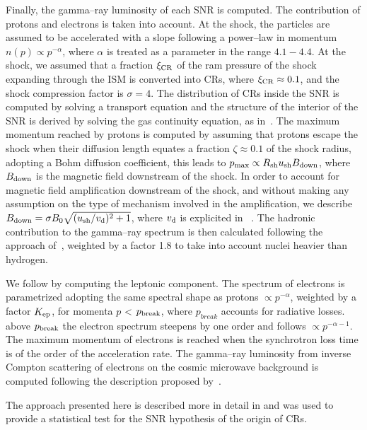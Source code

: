 \documentclass{article}
\begin{document}
Finally, the gamma--ray luminosity of each SNR is computed. The contribution of protons and electrons is taken into account. At the shock, the particles are assumed to be accelerated with a slope following a power--law in momentum $n(p) \propto p^{-\alpha}$, where $\alpha$ is treated as a parameter in the range $4.1 - 4.4$. At the shock, we assumed that a fraction $\xi_{\rm CR}$ of the ram pressure of the shock expanding through the ISM is converted into CRs, where $\xi_{\rm CR} \approx 0.1$, and the shock compression factor is $\sigma=4$.  
The distribution of CRs inside the SNR is computed by solving a transport equation and the structure of the interior of the SNR is derived by solving the gas continuity equation, as in~\cite{pz03,pz05}.
The maximum momentum reached by protons is computed by assuming that protons escape the shock when their diffusion length equates a fraction $\zeta \approx 0.1$ of the shock radius, adopting a Bohm diffusion coefficient, this leads to $p_{\max} \propto R_{\rm sh} u_{\rm sh} B_{\rm down}$, where $B_{\rm down}$ is the magnetic field downstream of the shock. In order to account for magnetic field amplification downstream of the shock, and without making any assumption on the type of mechanism involved in the amplification, we describe $B_{\rm down} = \sigma B_{0}\sqrt{({u_{\rm sh}}/{v_{\rm d}})^{2}+1}$, where $v_{\rm d}$ is explicited in~\cite{zirakashviliaharonian2010} .
The hadronic contribution to the gamma--ray spectrum is then calculated following the approach of~\cite{kelner2006}, weighted by a factor 1.8 to take into account nuclei heavier than hydrogen. 

We follow by computing the leptonic component. 
The spectrum of electrons is parametrized adopting the same spectral shape as protons $\propto p^{-\alpha}$, weighted by a factor $K_{\rm ep}$, for momenta $p$ < $p_{\rm break}$, where $p_{break}$ accounts for radiative losses. above $p_{\rm break}$ the electron spectrum steepens by one order and follows $\propto p^{-\alpha-1}$. The maximum momentum of electrons is reached when the synchrotron loss time is of the order of the acceleration rate. The gamma--ray luminosity from inverse Compton scattering of electrons on the cosmic microwave background is computed following the description proposed by~\cite{gould}.

The approach presented here is described more in detail in \cite{cristofari2013,cristofari2017} and was used to provide a statistical test for the SNR hypothesis of the origin of CRs. 
\end{document}
